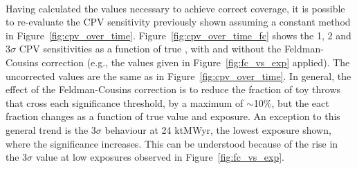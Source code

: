 \begin{figure*}[htbp]
  \centering
  \\
  \caption{Fraction of throws for which the DUNE sensitivity to CP-violation ($\deltacp \neq [0,\pm\pi]$) exceeds 1--3$\sigma$ significance, calculated using constant-\dchisq (dashed lines) and \dchisqcrit values calculated using the Feldman-Cousins method (shaded histograms), as a function of the true value of \deltacp. Shown for , for a number of different exposures. The number of throws used to make each figure is also shown.}
  \label{fig:cpv_over_time_fc}
\end{figure*}
Having calculated the \dchisqcrit values necessary to achieve correct coverage, it is possible to re-evaluate the CPV sensitivity previously shown assuming a constant \dchisq method in Figure~\ref{fig:cpv_over_time}. Figure~\ref{fig:cpv_over_time_fc} shows the 1, 2 and 3$\sigma$ CPV sensitivities as a function of true \deltacp, with and without the Feldman-Cousins correction (e.g., the \dchisqcrit values given in Figure~\ref{fig:fc_vs_exp} applied). The uncorrected values are the same as in Figure~\ref{fig:cpv_over_time}. In general, the effect of the Feldman-Cousins correction is to reduce the fraction of toy throws that cross each significance threshold, by a maximum of $\sim$10\%, but the eact fraction changes as a function of true \deltacp value and exposure. An exception to this general trend is the 3$\sigma$ behaviour at 24 ktMWyr, the lowest exposure shown, where the significance increases. This can be understood because of the rise in the 3$\sigma$ \dchisqcrit value at low exposures observed in Figure~\ref{fig:fc_vs_exp}.


